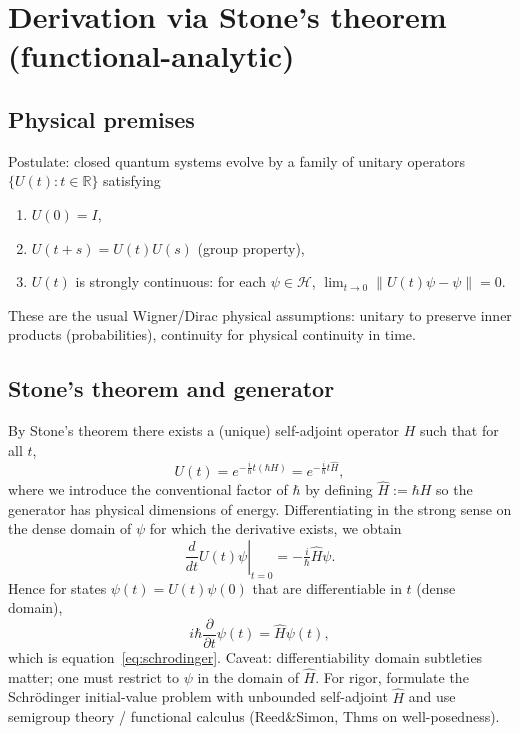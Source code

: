 \documentclass[11pt]{article}
\begin{document}
\section{Derivation via Stone's theorem (functional-analytic)}
\subsection{Physical premises}
Postulate: closed quantum systems evolve by a family of unitary operators $\{U(t):t\in\mathbb{R}\}$ satisfying
\begin{enumerate}
\item $U(0)=I$,
\item $U(t+s)=U(t)U(s)$ (group property),
\item $U(t)$ is strongly continuous: for each $\psi\in\mathcal{H}$, $\lim_{t\to0}\|U(t)\psi-\psi\|=0$.
\end{enumerate}
These are the usual Wigner/Dirac physical assumptions: unitary to preserve inner products (probabilities), continuity for physical continuity in time.

\subsection{Stone's theorem and generator}
By Stone's theorem there exists a (unique) self-adjoint operator $H$ such that for all $t$,
\begin{equation}
U(t)=e^{-\tfrac{i}{\hbar}t(\hbar H)}=e^{-\tfrac{i}{\hbar}t\hat H},
\end{equation}
where we introduce the conventional factor of $\hbar$ by defining $\hat H:=\hbar H$ so the generator has physical dimensions of energy.  Differentiating in the strong sense on the dense domain of $\psi$ for which the derivative exists, we obtain
\begin{equation}
\left.\frac{d}{dt}U(t)\psi\right|_{t=0}=-\tfrac{i}{\hbar}\hat H\psi.
\end{equation}
Hence for states $\psi(t)=U(t)\psi(0)$ that are differentiable in $t$ (dense domain),
\begin{equation}
i\hbar\frac{\partial}{\partial t}\psi(t)=\hat H\psi(t),
\end{equation}
which is equation~\eqref{eq:schrodinger}.  Caveat: differentiability domain subtleties matter; one must restrict to $\psi$ in the domain of $\hat H$.  For rigor, formulate the Schr\"odinger initial-value problem with unbounded self-adjoint $\hat H$ and use semigroup theory / functional calculus (Reed\&Simon, Thms on well-posedness).
\end{document}
